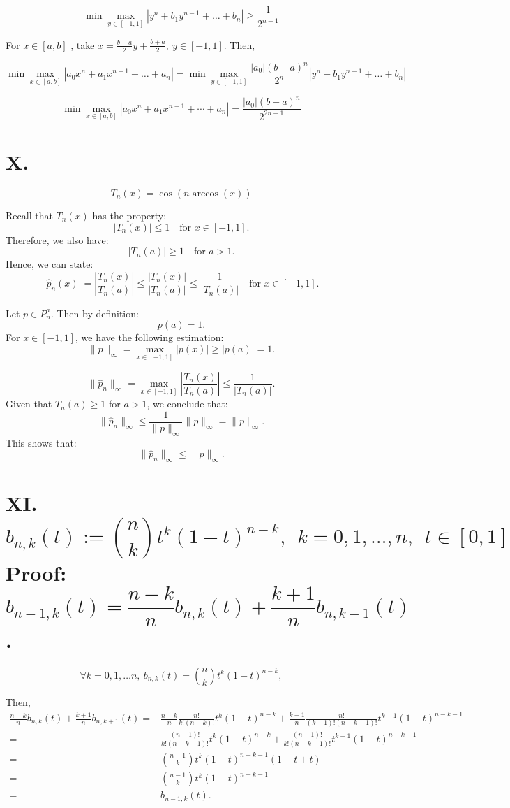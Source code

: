 \documentclass[a4paper]{article}
\begin{document}
\[\min \max_{y \in [-1,1]} |y^n+b_1y^{n-1}+\ldots+b_n| \geq \frac{1}{2^{n-1}}\]

For $x \in [a,b]$ , take $x=\frac{b-a}{2}y+\frac{b+a}{2},\ y \in [-1,1]$. Then,

\[\min \max_{x \in [a,b]} \left|a_0 x^n + a_1 x^{n-1} + \ldots + a_n \right|
= \min \max_{y \in [-1,1]} \frac{|a_0| (b-a)^n}{2^n} \left| y^n + b_1 y^{n-1} + \ldots + b_n \right|\]

\[\min \max_{x \in [a, b]} \left| a_0 x^n + a_1 x^{n-1} + \cdots + a_n \right|
= \frac{|a_0| (b-a)^n}{2^{2n-1}}\]

\section*{X. }
\[T_n(x) = \cos(n \arccos(x))\]

Recall that \(T_n(x)\) has the property:
    \[|T_n(x)| \leq 1 \quad \text{for } x \in [-1, 1].\]
    Therefore, we also have:
    \[|T_n(a)| \geq 1 \quad \text{for } a > 1.\]
    Hence, we can state:
    \[|\hat{p}_n(x)| = \left|\frac{T_n(x)}{T_n(a)}\right| \leq \frac{|T_n(x)|}{|T_n(a)|} \leq \frac{1}{|T_n(a)|} \quad \text{for } x \in [-1, 1].\]

 Let \(p \in P^a_n\). Then by definition:\[p(a) = 1.\]
    For \(x \in [-1, 1]\), we have the following estimation:
    \[\|p\|_\infty = \max_{x \in [-1, 1]} |p(x)| \geq |p(a)| = 1.\]

    \[ \|\hat{p}_n\|_\infty = \max_{x \in [-1, 1]} \left| \frac{T_n(x)}{T_n(a)} \right| \leq \frac{1}{|T_n(a)|}.\]
    Given that \(T_n(a) \geq 1\) for \(a > 1\), we conclude that:
    \[\|\hat{p}_n\|_\infty \leq \frac{1}{\|p\|_\infty} \|p\|_\infty = \|p\|_\infty.\]
    This shows that:
    \[\|\hat{p}_n\|_\infty \leq \|p\|_\infty.\]

\section*{XI. \[b_{n,k}(t):=\binom{n}{k} t^k (1-t)^{n-k},\ \ k = 0, 1, \ldots, n,\ \ t \in [0,1]\]
Proof: \[ b_{n-1,k}(t)= \frac{n-k}{n} b_{n,k}(t)+\frac{k+1}{n} b_{n,k+1}(t)\]. }

$$
\forall k = 0, 1, \dots n,\ b_{n, k}(t)=\binom{n}{k}t^k(1-t)^{n-k},
$$

Then, 
$$\begin{aligned}
   \frac{n-k}{n}b_{n,k}(t)+\frac{k+1}{n}b_{n,k+1}(t)
   =& \frac{n-k}{n} \frac{n!}{k!(n-k)!} t^k(1-t)^{n-k}+ \frac{k+1}{n} \frac{n!}{(k+1)!(n-k-1)!} t^{k+1}(1-t)^{n-k-1} \\
   =& \frac{(n-1)!}{k!(n-k-1)!} t^k(1-t)^{n-k} +\frac{(n-1)!}{k!(n-k-1)!} t^{k+1}(1-t)^{n-k-1} \\
   =& \binom{n-1}{k} t^k(1-t)^{n-k-1}(1 - t + t)   \\
   =& \binom{n-1}{k} t^k(1-t)^{n-k-1}  \\
   =& b_{n-1, k}(t).
\end{aligned}$$
\end{document}
